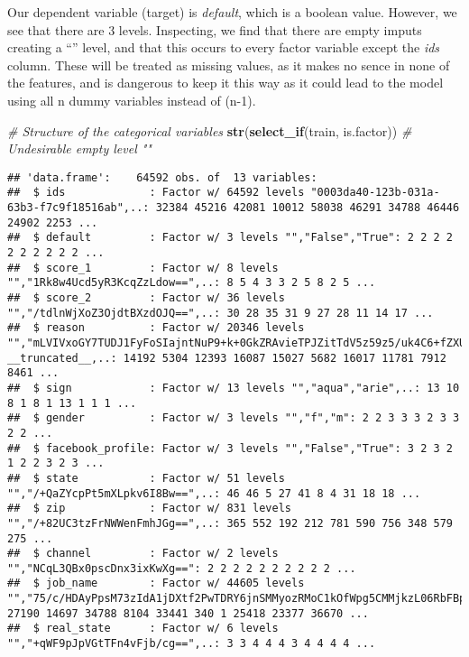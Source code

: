 \documentclass[]{article}
\newenvironment{Shaded}{\begin{snugshade}}{\end{snugshade}}
\newcommand{\KeywordTok}[1]{\textcolor[rgb]{0.13,0.29,0.53}{\textbf{#1}}}
\newcommand{\CommentTok}[1]{\textcolor[rgb]{0.56,0.35,0.01}{\textit{#1}}}
\newcommand{\NormalTok}[1]{#1}
\begin{document}
Our dependent variable (target) is \emph{default}, which is a boolean
value. However, we see that there are 3 levels. Inspecting, we find that
there are empty imputs creating a ``'' level, and that this occurs to
every factor variable except the \emph{ids} column. These will be
treated as missing values, as it makes no sence in none of the features,
and is dangerous to keep it this way as it could lead to the model using
all n dummy variables instead of (n-1).

\begin{Shaded}
\begin{Highlighting}[]
\CommentTok{# Structure of the categorical variables}
\KeywordTok{str}\NormalTok{(}\KeywordTok{select_if}\NormalTok{(train, is.factor)) }\CommentTok{# Undesirable empty level ""}
\end{Highlighting}
\end{Shaded}

\begin{verbatim}
## 'data.frame':    64592 obs. of  13 variables:
##  $ ids             : Factor w/ 64592 levels "0003da40-123b-031a-63b3-f7c9f18516ab",..: 32384 45216 42081 10012 58038 46291 34788 46446 24902 2253 ...
##  $ default         : Factor w/ 3 levels "","False","True": 2 2 2 2 2 2 2 2 2 2 ...
##  $ score_1         : Factor w/ 8 levels "","1Rk8w4Ucd5yR3KcqZzLdow==",..: 8 5 4 3 3 2 5 8 2 5 ...
##  $ score_2         : Factor w/ 36 levels "","/tdlnWjXoZ3OjdtBXzdOJQ==",..: 30 28 35 31 9 27 28 11 14 17 ...
##  $ reason          : Factor w/ 20346 levels "","mLVIVxoGY7TUDJ1FyFoSIajntNuP9+k+0GkZRAvieTPJZitTdV5z59z5/uk4C6+fZXU2S3kiwPuazYT7i37CXbRGYQtX88kfDD9crRqaZ23MJ+w"| __truncated__,..: 14192 5304 12393 16087 15027 5682 16017 11781 7912 8461 ...
##  $ sign            : Factor w/ 13 levels "","aqua","arie",..: 13 10 8 1 8 1 13 1 1 1 ...
##  $ gender          : Factor w/ 3 levels "","f","m": 2 2 3 3 3 2 3 3 2 2 ...
##  $ facebook_profile: Factor w/ 3 levels "","False","True": 3 2 3 2 1 2 2 3 2 3 ...
##  $ state           : Factor w/ 51 levels "","/+QaZYcpPt5mXLpkv6I8Bw==",..: 46 46 5 27 41 8 4 31 18 18 ...
##  $ zip             : Factor w/ 831 levels "","/+82UC3tzFrNWWenFmhJGg==",..: 365 552 192 212 781 590 756 348 579 275 ...
##  $ channel         : Factor w/ 2 levels "","NCqL3QBx0pscDnx3ixKwXg==": 2 2 2 2 2 2 2 2 2 2 ...
##  $ job_name        : Factor w/ 44605 levels "","75/c/HDAyPpsM73zIdA1jDXtf2PwTDRY6jnSMMyozRMoC1kOfWpg5CMMjkzL06RbFBpFI+bOjpbL81eMKYQpn7rWti3gS2ZrYcVIAr01+xE=",..: 27190 14697 34788 8104 33441 340 1 25418 23377 36670 ...
##  $ real_state      : Factor w/ 6 levels "","+qWF9pJpVGtTFn4vFjb/cg==",..: 3 3 4 4 4 3 4 4 4 4 ...
\end{verbatim}
\end{document}
